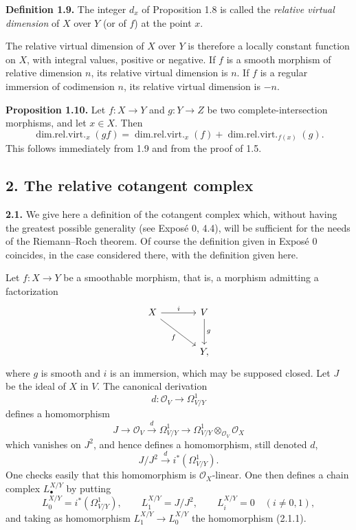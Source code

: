 \documentclass[11pt]{article}
\begin{document}
\textbf{Definition 1.9.} The integer $d_x$ of Proposition 1.8 is called the \emph{relative virtual dimension} of $X$ over $Y$ (or of $f$) at the point $x$.

The relative virtual dimension of $X$ over $Y$ is therefore a locally constant function on $X$, with integral values, positive or negative. If $f$ is a smooth morphism of relative dimension $n$, its relative virtual dimension is $n$. If $f$ is a regular immersion of codimension $n$, its relative virtual dimension is $-n$.

\textbf{Proposition 1.10.} Let $f:X\to Y$ and $g:Y\to Z$ be two complete-intersection morphisms, and let $x\in X$. Then
\[
\operatorname{dim.rel.virt.}_x(gf)=
\operatorname{dim.rel.virt.}_x(f)+
\operatorname{dim.rel.virt.}_{f(x)}(g).
\]
This follows immediately from 1.9 and from the proof of 1.5.

\subsection*{2. The relative cotangent complex}

\textbf{2.1.} We give here a definition of the cotangent complex which, without having the greatest possible generality (see Expos\'e 0, 4.4), will be sufficient for the needs of the Riemann--Roch theorem. Of course the definition given in Expos\'e 0 coincides, in the case considered there, with the definition given here.

Let $f:X\to Y$ be a smoothable morphism, that is, a morphism admitting a factorization
\[
\begin{tikzcd}[column sep=large,row sep=large]
X \arrow[r,"i"] \arrow[dr,"f"'] & V \arrow[d,"g"]\\
& Y,
\end{tikzcd}
\]
where $g$ is smooth and $i$ is an immersion, which may be supposed closed. Let $J$ be the ideal of $X$ in $V$. The canonical derivation
\[
d:\mathcal O_V\longrightarrow\Omega^1_{V/Y}
\]
defines a homomorphism
\[
J\longrightarrow\mathcal O_V\xrightarrow{d}\Omega^1_{V/Y}\longrightarrow
\Omega^1_{V/Y}\otimes_{\mathcal O_V}\mathcal O_X
\]
which vanishes on $J^2$, and hence defines a homomorphism, still denoted $d$,
\begin{equation}\tag{2.1.1}
J/J^2\xrightarrow{d} i^*(\Omega^1_{V/Y}).
\end{equation}
One checks easily that this homomorphism is $\mathcal O_X$-linear. One then defines a chain complex $L^{X/Y}_\bullet$ by putting
\[
L^{X/Y}_0=i^*(\Omega^1_{V/Y}),\qquad
L^{X/Y}_1=J/J^2,
\qquad
L^{X/Y}_i=0\quad(i\neq 0,1),
\]
and taking as homomorphism $L^{X/Y}_1\to L^{X/Y}_0$ the homomorphism (2.1.1).
\end{document}
